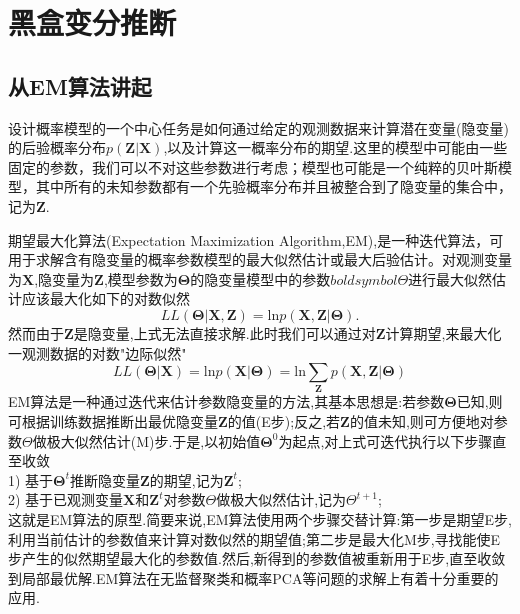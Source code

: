 \documentclass{ctexart}
\begin{document}
\section{黑盒变分推断}
\subsection{从EM算法讲起}
设计概率模型的一个中心任务是如何通过给定的观测数据来计算潜在变量(隐变量)的后验概率分布$p(\mathbf{Z|X})$,以及计算这一概率分布的期望.这里的模型中可能由一些固定的参数，我们可以不对这些参数进行考虑；模型也可能是一个纯粹的贝叶斯模型，其中所有的未知参数都有一个先验概率分布并且被整合到了隐变量的集合中，记为$\mathbf{Z}$.


期望最大化算法(Expectation Maximization Algorithm,EM),是一种迭代算法，可用于求解含有隐变量的概率参数模型的最大似然估计或最大后验估计。对观测变量为$\mathbf{X}$,隐变量为$\mathbf{Z}$,模型参数为$\boldsymbol{\Theta}$的隐变量模型中的参数$boldsymbol{\Theta}$进行最大似然估计应该最大化如下的对数似然
\begin{equation*}
LL(\boldsymbol{\Theta}|\mathbf{X,Z}) = \text{ln}p(\mathbf{X,Z}|\boldsymbol{\Theta}).
\end{equation*}
然而由于$\mathbf{Z}$是隐变量,上式无法直接求解.此时我们可以通过对$\mathbf{Z}$计算期望,来最大化一观测数据的对数"边际似然"
\begin{equation*}
LL(\boldsymbol{\Theta}|\mathbf{X}) = \text{ln}p(\mathbf{X}|\boldsymbol{\Theta}) = \text{ln}\sum_{\mathbf{Z}}p(\mathbf{X,Z}|\boldsymbol{\Theta})
\end{equation*}
EM算法是一种通过迭代来估计参数隐变量的方法,其基本思想是:若参数$\boldsymbol{\Theta}$已知,则可根据训练数据推断出最优隐变量$\mathbf{Z}$的值(E步);反之,若$\mathbf{Z}$的值未知,则可方便地对参数$\Theta$做极大似然估计(M)步.于是,以初始值$\boldsymbol{\Theta}^0$为起点,对上式可迭代执行以下步骤直至收敛\\
1) 基于$\boldsymbol{\Theta}^t$推断隐变量$\mathbf{Z}$的期望,记为$\mathbf{Z}^t$;\\
2) 基于已观测变量$\mathbf{X}$和$\mathbf{Z}^t$对参数$\Theta$做极大似然估计,记为$\Theta^{t+1}$;\\
这就是EM算法的原型.简要来说,EM算法使用两个步骤交替计算:第一步是期望E步,利用当前估计的参数值来计算对数似然的期望值;第二步是最大化M步,寻找能使E步产生的似然期望最大化的参数值.然后,新得到的参数值被重新用于E步,直至收敛到局部最优解.EM算法在无监督聚类和概率PCA等问题的求解上有着十分重要的应用.
\end{document}
